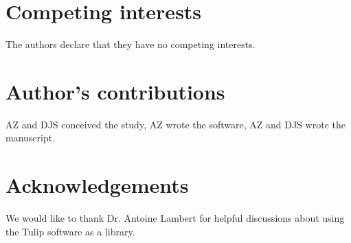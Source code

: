 \documentclass{bmcart}
\begin{document}

\begin{backmatter}

\section*{Competing interests}
The authors declare that they have no competing interests.

\section*{Author's contributions}
AZ and DJS conceived the study, AZ wrote the software, AZ and DJS wrote the manuscript.

\section*{Acknowledgements}
We would like to thank Dr. Antoine Lambert for helpful discussions about using the Tulip software as a library.





\end{backmatter}
\end{document}
